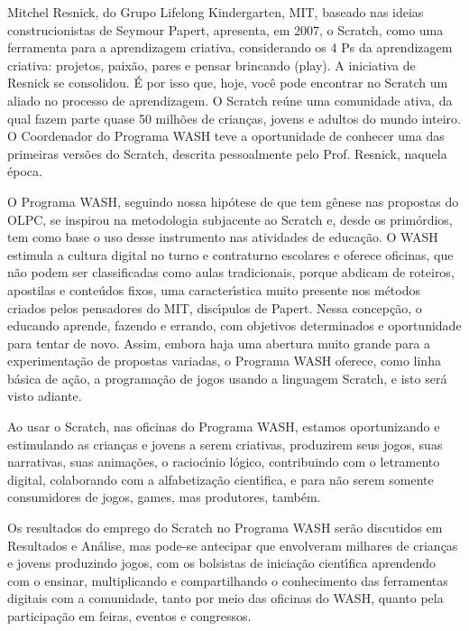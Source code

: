 \documentclass[
12pt,		%
openright,	%
twoside,  %
a4paper,			%
chapter=TITLE,		%
english,			%
french,				%
spanish,			%
brazil				%
]{USPSC-classe/USPSC}
\begin{document}
Mitchel Resnick, do Grupo Lifelong Kindergarten, MIT, baseado nas ideias construcionistas de Seymour Papert, apresenta, em 2007, o Scratch, como uma ferramenta para a aprendizagem criativa, considerando os 4 Ps da aprendizagem criativa: projetos, paix\~ao, pares e pensar brincando (play). A iniciativa de Resnick se consolidou. \'E por isso que, hoje, voc\^e pode encontrar no Scratch um aliado no processo de aprendizagem. O Scratch re\'une uma comunidade ativa, da qual fazem parte quase 50 milh\~oes de crian\c{c}as, jovens e adultos do mundo inteiro. O Coordenador do Programa WASH teve a oportunidade de conhecer uma das primeiras vers\~oes do Scratch, descrita pessoalmente pelo Prof. Resnick, naquela \'epoca.




O Programa WASH, seguindo nossa hip\'otese de que tem g\^enese nas propostas do OLPC, se inspirou na metodologia subjacente ao Scratch e, desde os prim\'ordios, tem como base o uso desse instrumento nas atividades de educa\c{c}\~ao. O WASH estimula a cultura digital no turno e contraturno escolares e oferece oficinas, que n\~ao podem ser classificadas como aulas tradicionais, porque abdicam de roteiros, apostilas e conte\'udos fixos, uma caracter\'{\i}stica muito presente nos m\'etodos criados pelos pensadores do MIT, disc\'{\i}pulos de Papert. Nessa concep\c{c}\~ao, o educando aprende, fazendo e errando, com objetivos determinados e oportunidade para tentar de novo. Assim, embora haja uma abertura muito grande para a experimenta\c{c}\~ao de propostas variadas, o Programa WASH oferece, como linha b\'asica de a\c{c}\~ao, a programa\c{c}\~ao de jogos usando a linguagem Scratch, e isto ser\'a visto adiante.




Ao usar o Scratch, nas oficinas do Programa WASH, estamos oportunizando e estimulando \textquotedbl as crian\c{c}as e jovens a serem criativas, produzirem seus jogos, suas narrativas, suas anima\c{c}\~oes, o racioc\'{\i}nio l\'ogico, contribuindo com o letramento digital, colaborando com a alfabetiza\c{c}\~ao cient\'{\i}fica, e para n\~ao serem somente consumidores de jogos, games, mas produtores, tamb\'em\textquotedbl .




Os resultados do emprego do Scratch no Programa WASH ser\~ao discutidos em Resultados e An\'alise, mas pode-se antecipar que envolveram milhares de crian\c{c}as e jovens produzindo jogos, com os bolsistas de inicia\c{c}\~ao cient\'{\i}fica aprendendo com o ensinar, multiplicando e compartilhando o conhecimento das ferramentas digitais  com a comunidade, tanto por meio das oficinas do WASH, quanto pela participa\c{c}\~ao em feiras, eventos e congressos.
\end{document}
